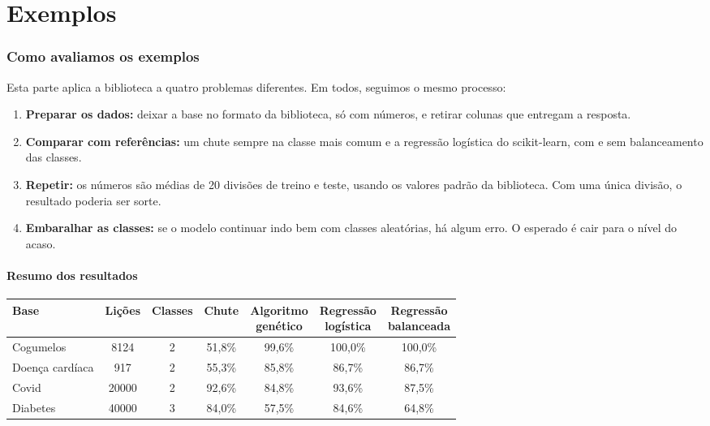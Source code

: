 \documentclass[11pt,a4paper]{article}
\newenvironment{tabela}{\par\nopagebreak[4]\vspace{0.3em}\nopagebreak[4]\begingroup\centering\small}{\par\endgroup\vspace{0.6em}}
\begin{document}
\clearpage
\part{Exemplos}

\section{Como avaliamos os exemplos}

Esta parte aplica a biblioteca a quatro problemas diferentes. Em todos, seguimos o mesmo processo:

\begin{enumerate}
  \item \textbf{Preparar os dados:} deixar a base no formato da biblioteca, só com números, e retirar colunas que entregam a resposta.
  \item \textbf{Comparar com referências:} um chute sempre na classe mais comum e a regressão logística do scikit-learn, com e sem balanceamento das classes.
  \item \textbf{Repetir:} os números são médias de 20 divisões de treino e teste, usando os valores padrão da biblioteca. Com uma única divisão, o resultado poderia ser sorte.
  \item \textbf{Embaralhar as classes:} se o modelo continuar indo bem com classes aleatórias, há algum erro. O esperado é cair para o nível do acaso.
\end{enumerate}

\subsection{Resumo dos resultados}

\begin{tabela}
\setlength{\tabcolsep}{4pt}
\begin{tabular}{lcccccc}
\toprule
Base & Lições & Classes & Chute & \shortstack{Algoritmo\\genético} & \shortstack{Regressão\\logística} & \shortstack{Regressão\\balanceada}\\
\midrule
Cogumelos & 8124 & 2 & 51,8\% & 99,6\% & 100,0\% & 100,0\%\\
Doença cardíaca & 917 & 2 & 55,3\% & 85,8\% & 86,7\% & 86,7\%\\
Covid & 20000 & 2 & 92,6\% & 84,8\% & 93,6\% & 87,5\%\\
Diabetes & 40000 & 3 & 84,0\% & 57,5\% & 84,6\% & 64,8\%\\
\bottomrule
\end{tabular}
\end{tabela}
\end{document}
